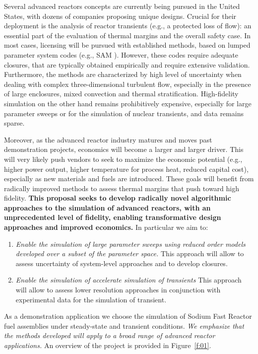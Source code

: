 Several  advanced reactors concepts are currently being pursued in the United
States, with dozens of companies proposing unique designs. Crucial for their
deployment is the analysis of  reactor transients (e.g., a protected loss of
flow): an essential part of the evaluation of thermal margins and the overall
safety case.  In most cases, licensing will be pursued with established
methods, based on lumped parameter system codes (e.g., SAM \cite{hu2021}).
However, these codes require adequate closures, that are typically obtained
empirically and require extensive validation. Furthermore, the methods are
characterized by high level of uncertainty when dealing with complex
three-dimensional turbulent flow, especially in the presence of large
enclosures, mixed convection and thermal stratification. High-fidelity
simulation on the other hand remains prohibitively expensive, especially for
large parameter sweeps or for the simulation of nuclear transients, and data
remains sparse.

Moreover, as the advanced reactor industry matures and moves past demonstration
projects, economics will become a larger and larger driver. This will very
likely push vendors to seek to maximize the economic potential (e.g., higher
power output, higher temperature for process heat, reduced capital cost),
especially as new materials and fuels are introduced. These goals will benefit
from radically improved methods to assess thermal margins that push toward high
fidelity. \textbf{This proposal seeks to develop radically novel algorithmic
approaches to the simulation of advanced reactors, with an unprecedented level
of fidelity, enabling transformative design approaches and improved economics.}
In particular we aim to:
\begin{enumerate}
%
   \item \textit{Enable the simulation of large parameter sweeps using reduced
   order models developed over a subset of the parameter space.} This approach
   will allow to assess uncertainty of system-level approaches and to develop
   closures.
%
   \item \textit{Enable the simulation of accelerate simulation of transients }
   This approach will allow to assess lower resolution approaches in conjunction
   with experimental data for the simulation of transient.
\end{enumerate}
As a demonstration application we choose the simulation of Sodium Fast Reactor
fuel assemblies under steady-state and transient conditions. \textit{ We
emphasize that the methods developed will apply to a broad range of advanced
reactor applications.} An overview of the project is provided in Figure~\ref{f:01}.

